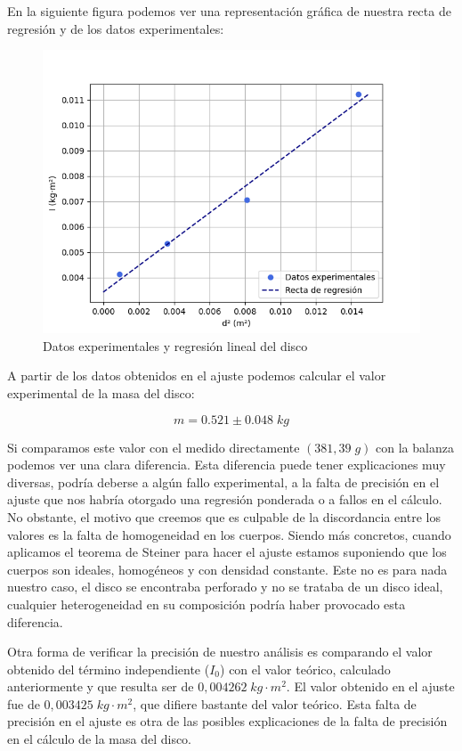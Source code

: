 \documentclass[a4paper,12pt,titlepage]{article}
\begin{document}
En la siguiente figura podemos ver una representación gráfica de nuestra recta de regresión y de los datos experimentales:

\begin{figure}[h!]
    \centering
    \includegraphics[width=0.85\linewidth]{Images/regSteiner1.png}
    \caption{Datos experimentales y regresión lineal del disco}
\end{figure}

A partir de los datos obtenidos en el ajuste podemos calcular el valor experimental de la masa del disco:

\begin{equation}
    m = 0.521 \pm 0.048 \; kg
\end{equation}

Si comparamos este valor con el medido directamente $(381,39 \;g)$ con la balanza podemos ver una clara diferencia. Esta diferencia puede tener explicaciones muy diversas, podría deberse a algún fallo experimental, a la falta de precisión en el ajuste que nos habría otorgado una regresión ponderada o a fallos en el cálculo. No obstante, el motivo que creemos que es culpable de la discordancia entre los valores es la falta de homogeneidad en los cuerpos. Siendo más concretos, cuando aplicamos el teorema de Steiner para hacer el ajuste estamos suponiendo que los cuerpos son ideales, homogéneos y con densidad constante. Este no es para nada nuestro caso, el disco se encontraba perforado y no se trataba de un disco ideal, cualquier heterogeneidad en su composición podría haber provocado esta diferencia.

\par Otra forma de verificar la precisión de nuestro análisis es comparando el valor obtenido del término independiente ($I_0$) con el valor teórico, calculado anteriormente y que resulta ser de $0,004262 \; kg \cdot m^2$. El valor obtenido en el ajuste fue de $0,003425 \; kg \cdot m^2$, que difiere bastante del valor teórico. Esta falta de precisión en el ajuste es otra de las posibles explicaciones de la falta de precisión en el cálculo de la masa del disco.
\end{document}
